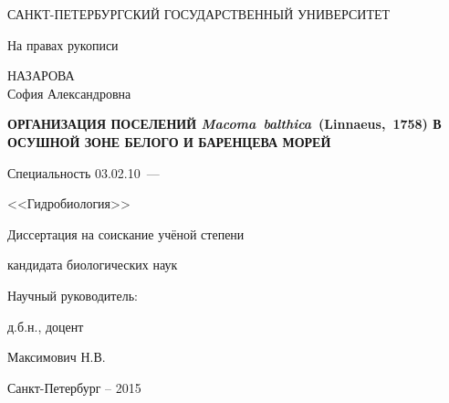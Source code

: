 \thispagestyle{empty}

\begin{center}
САНКТ-ПЕТЕРБУРГСКИЙ ГОСУДАРСТВЕННЫЙ УНИВЕРСИТЕТ\par
\par
\end{center}

\vspace{20mm}
\begin{flushright}
На правах рукописи

\end{flushright}

\vspace{30mm}
\begin{center}
{\large НАЗАРОВА\\ София Александровна}
\end{center}

\vspace{5mm}
\begin{center}
{\bfseries \large ОРГАНИЗАЦИЯ ПОСЕЛЕНИЙ {\itshape Macoma~balthica}~(Linnaeus,~1758) В ОСУШНОЙ ЗОНЕ БЕЛОГО И БАРЕНЦЕВА МОРЕЙ
\par}

\vspace{10mm}
{%
Специальность 03.02.10~---

<<Гидробиология>>
}

\vspace{10mm}
Диссертация на соискание учёной степени

кандидата биологических наук
\end{center}

\vspace{20mm}
\begin{flushright}
Научный руководитель:

д.б.н., доцент

Максимович Н.В.

\end{flushright}

\vspace{20mm}
\begin{center}
{Санкт-Петербург  -- 2015}
\end{center}

\newpage
